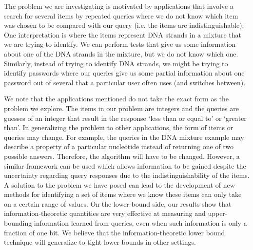 \documentclass[12pt]{article}
\begin{document}
The problem we are investigating is motivated by applications that involve a search for several items by repeated queries where we do not know which item was chosen to be compared with our query (i.e. the items are indistinguishable). One interpretation is where the items represent DNA strands in a mixture that we are trying to identify. We can perform tests that give us some information about one of the DNA strands in the mixture, but we do not know which one. Similarly, instead of trying to identify DNA strands, we might be trying to identify passwords where our queries give us some partial information about one password out of several that a particular user often uses (and switches between). 

We note that the applications mentioned do not take the exact form as the problem we explore. The items in our problem are integers and the queries are guesses of an integer that result in the response `less than or equal to' or `greater than'. In generalizing the problem to other applications, the form of items or queries may change. For example, the queries in the DNA mixture example may describe a property of a particular nucleotide instead of returning one of two possible answers. Therefore, the algorithm will have to be changed. However, a similar framework can be used which allows information to be gained despite the uncertainty regarding query responses due to the indistinguishability of the items. A solution to the problem we have posed can lead to the development of new methods for identifying a set of items where we know these items can only take on a certain range of values.
On the lower-bound side, our results show that information-theoretic quantities are very effective at measuring and upper-bounding information learned from queries, even when such information is only a fraction of one bit. 
We believe that the information-theoretic lower bound technique will generalize to tight lower bounds in other settings. 
\end{document}

